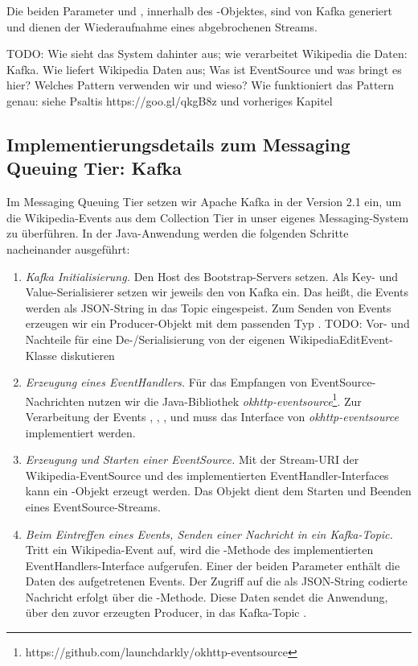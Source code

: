 Die beiden Parameter  und , innerhalb des -Objektes, sind von Kafka generiert und dienen der Wiederaufnahme eines abgebrochenen Streams.

TODO: Wie sieht das System dahinter aus; wie verarbeitet Wikipedia die Daten: Kafka. Wie liefert Wikipedia Daten aus; Was ist EventSource und was bringt es hier?
 Welches Pattern verwenden wir und wieso? Wie funktioniert das Pattern genau: siehe Psaltis https://goo.gl/qkgB8z und vorheriges Kapitel

\subsection{Implementierungsdetails zum Messaging Queuing Tier: Kafka}
Im Messaging Queuing Tier setzen wir Apache Kafka in der Version 2.1 ein, um die Wikipedia-Events aus dem Collection Tier
in unser eigenes Messaging-System zu überführen. In der Java-Anwendung werden die folgenden
Schritte nacheinander ausgeführt:
\begin{enumerate}
    \item \textit{Kafka Initialisierung.} Den Host des Bootstrap-Servers setzen. Als Key- und Value-Serialisierer setzen wir
    jeweils den  von Kafka ein. Das heißt, die Events werden als JSON-String in das Topic 
    eingespeist. Zum Senden von Events erzeugen wir ein Producer-Objekt mit dem passenden Typ .
    TODO: Vor- und Nachteile für eine De-/Serialisierung von der eigenen WikipediaEditEvent-Klasse diskutieren
    \item \textit{Erzeugung eines EventHandlers.} Für das Empfangen von EventSource-Nachrichten nutzen wir die Java-Bibliothek
    \textit{okhttp-eventsource}\footnote{https://github.com/launchdarkly/okhttp-eventsource}. Zur Verarbeitung der Events
    , , ,  und  muss das Interface  von
    \textit{okhttp-eventsource} implementiert werden.
    \item \textit{Erzeugung und Starten einer EventSource.} Mit der Stream-URI der Wikipedia-EventSource und des implementierten EventHandler-Interfaces
    kann ein -Objekt erzeugt werden. Das Objekt dient dem Starten und Beenden eines EventSource-Streams.
    \item \textit{Beim Eintreffen eines Events, Senden einer Nachricht in ein Kafka-Topic.} Tritt ein Wikipedia-Event auf,
    wird die -Methode des implementierten EventHandlers-Interface aufgerufen. Einer der beiden Parameter enthält die Daten
    des aufgetretenen Events. Der Zugriff auf die als JSON-String codierte Nachricht erfolgt über die -Methode.
    Diese Daten sendet die Anwendung, über den zuvor erzeugten Producer, in das Kafka-Topic .
\end{enumerate}

